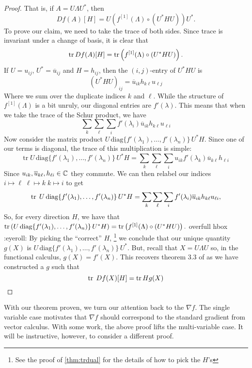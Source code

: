 \begin{proof}
That is, if $A = U   \Lambda U ^{*} $, then
\[
  Df(A)[H] = U \left( f ^{[1]} (\Lambda) \circ (U ^{* } H U) \right)U ^{*}.
\]
%
To prove our claim, we need to take the trace of both sides. Since trace is
invariant under a change of basis, it is clear that
\[
  \operatorname{tr} Df(A)[H] = \operatorname{tr} \left( f ^{[1]} (\Lambda) \circ (U ^{* } H U) \right).
\]
If $U = u_{ij}$, $U ^{*} = \overline{u}_{ij}$ and $H = h_{ij}$, then the
$(i,j)$-entry of $U ^{*}HU$ is
\[
  {(U ^{* } H U)}_{ij} = \overline{u}_{ik}h_{k\ell}u_{\ell j}
\]
Where we sum over the duplicate indices $k$ and $\ell$. While the structure of
$f ^{[1]} (\Lambda)$ is a bit unruly, our diagonal entries are $f'(\lambda)$.
This means that when we take the trace of the Schur product, we have
\[
 \sum_k\sum_\ell \sum_i f'(\lambda_i)\overline{u}_{ik}h_{k\ell}u_{\ell i}
\]
Now consider the matrix product
$U\, \text{diag} \{f'(\lambda_1), \dots ,f'(\lambda_n)\} \,U ^{*} H $. Since one of our terms
is diagonal, the trace of this multiplication is simple:
\[
  \text{tr}\; U \,\text{diag} \{f'(\lambda_1), \dots ,f'(\lambda_n)\}\, U ^{*} H
  = \sum_k\sum_\ell\sum_i  u_{ik}f'(\lambda_k) \overline{u}_{k \ell} h_{\ell i}
\]
Since \(u_{ik}, \overline{u}_{k\ell}, h_{\ell i} \in \mathbb{C} \) they commute. We can
then relabel our indices
$i \mapsto \ell\; \ell \mapsto k \; k \mapsto i $ to get
\[
  \operatorname{tr}\; U \,\text{diag} \{f'(\lambda_1), \dots ,f'(\lambda_n)\}\, U ^{*} H
  = \sum_k\sum_\ell \sum_i f'(\lambda_i) \overline{u}_{i k} h_{k \ell}u_{\ell i},
\]
So, for every direction \(H\), we have that
$\operatorname{tr} \left( U\, \text{diag} \{f'(\lambda_1), \dots ,f'(\lambda_n)\} \,U ^{*} H\right) =
   \operatorname{tr} \left( f ^{[1]} (\Lambda) \circ (U ^{* } H U) \right). $
{\color{red} overfull hbox :eyeroll:}
By picking the ``correct'' \(H\),
\footnote{See the proof of \ref{thm:trdual} for the details of how to pick the
  \(H\)'s}
we conclude that our unique quantity \(g(X)\) is
\(U\, \text{diag} \{f'(\lambda_1), \dots ,f'(\lambda_n)\} \,U ^{*} \). But,
recall that \(X=U\Lambda U\) so, in the functional calculus, $g(X) = f'(X)$.
This recovers theorem 3.3 of \cite{pascoeTrace2020} as we have constructed a
\(g\) such that
\[
  \operatorname{tr} \; Df(X)[H] = \operatorname{tr} H g(X)
\]
\end{proof}

With our theorem proven, we turn our attention back to the \(\nabla f\). The
single variable case motivates that \(\nabla f\) should correspond to the
standard gradient from vector calculus. With some work, the above proof lifts
the multi-variable case. It will be instructive, however, to consider a
different proof.

